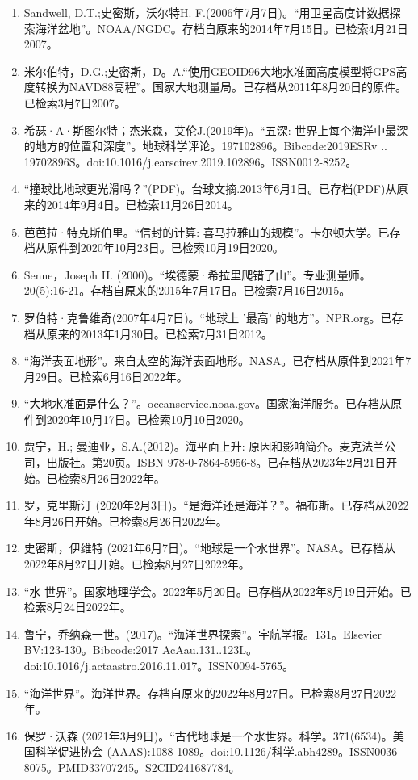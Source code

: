 \begin{enumerate}
\item Sandwell, D.T.;史密斯，沃尔特H. F.(2006年7月7日)。“用卫星高度计数据探索海洋盆地”。NOAA/NGDC。存档自原来的2014年7月15日。已检索4月21日2007。
\item 米尔伯特，D.G.;史密斯，D。A.“使用GEOID96大地水准面高度模型将GPS高度转换为NAVD88高程”。国家大地测量局。已存档从2011年8月20日的原件。已检索3月7日2007。
\item 希瑟·A·斯图尔特；杰米森，艾伦J.(2019年)。“五深: 世界上每个海洋中最深的地方的位置和深度”。地球科学评论。197102896。Bibcode:2019ESRv .. 19702896S。doi:10.1016/j.earscirev.2019.102896。ISSN0012-8252。 
\item “撞球比地球更光滑吗？”(PDF)。台球文摘.2013年6月1日。已存档(PDF)从原来的2014年9月4日。已检索11月26日2014。
\item 芭芭拉·特克斯伯里。“信封的计算: 喜马拉雅山的规模”。卡尔顿大学。已存档从原件到2020年10月23日。已检索10月19日2020。
\item Senne，Joseph H. (2000)。“埃德蒙·希拉里爬错了山”。专业测量师。20(5):16-21。存档自原来的2015年7月17日。已检索7月16日2015。
\item 罗伯特·克鲁维奇(2007年4月7日)。“地球上 '最高' 的地方”。NPR.org。已存档从原来的2013年1月30日。已检索7月31日2012。
\item “海洋表面地形”。来自太空的海洋表面地形。NASA。已存档从原件到2021年7月29日。已检索6月16日2022年。
\item “大地水准面是什么？”。oceanservice.noaa.gov。国家海洋服务。已存档从原件到2020年10月17日。已检索10月10日2020。
\item 贾宁，H.; 曼迪亚，S.A.(2012)。海平面上升: 原因和影响简介。麦克法兰公司，出版社。第20页。ISBN 978-0-7864-5956-8。已存档从2023年2月21日开始。已检索8月26日2022年。
\item 罗，克里斯汀 (2020年2月3日)。“是海洋还是海洋？”。福布斯。已存档从2022年8月26日开始。已检索8月26日2022年。
\item 史密斯，伊维特 (2021年6月7日)。“地球是一个水世界”。NASA。已存档从2022年8月27日开始。已检索8月27日2022年。
\item “水-世界”。国家地理学会。2022年5月20日。已存档从2022年8月19日开始。已检索8月24日2022年。
\item 鲁宁，乔纳森一世。(2017)。“海洋世界探索”。宇航学报。131。Elsevier BV:123-130。Bibcode:2017 AcAau.131..123L。doi:10.1016/j.actaastro.2016.11.017。ISSN0094-5765。 
\item “海洋世界”。海洋世界。存档自原来的2022年8月27日。已检索8月27日2022年。
\item 保罗·沃森 (2021年3月9日)。“古代地球是一个水世界。科学。371(6534)。美国科学促进协会 (AAAS):1088-1089。doi:10.1126/科学.abh4289。ISSN0036-8075。PMID33707245。S2CID241687784。   

\end{enumerate}
